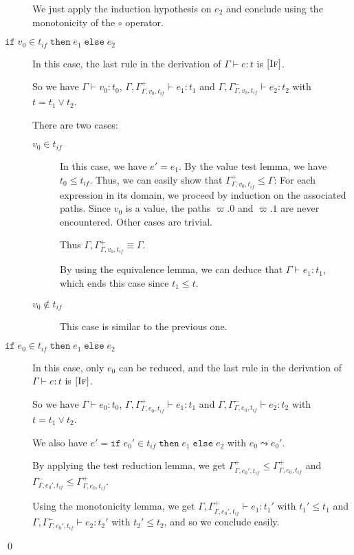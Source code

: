 \documentclass[a4paper]{article}%
\newcommand{\ite}[4]{\ensuremath{\texttt{if}\;#1\in#2\;\texttt{then}\;#3\;\texttt{else}\;#4}}
\theoremstyle{definition}
\newcommand {\Rule}[1] {[\textsc{#1}]}
\begin{document}
\begin{description}
          We just apply the induction hypothesis on $e_2$ and conclude using the monotonicity of the $\circ$ operator.
          \item[$\ite {v_0} {t_{if}} {e_1} {e_2}$] In this case, the last rule in the derivation of $\Gamma \vdash e:t$ is $\Rule{If}$.
           
          So we have $\Gamma \vdash v_0 : t_0$, $\Gamma, \Gamma^+_{\Gamma,v_0,t_{if}}\vdash e_1 : t_1$ and $\Gamma, \Gamma^-_{\Gamma,v_0,t_{if}}\vdash e_2 : t_2$ with $t=t_1\vee t_2$.
    
          There are two cases:
          \begin{description}
            \item[$v_0 \in t_{if}$] In this case, we have $e'=e_1$.
            By the value test lemma, we have $t_0 \leq t_{if}$.
            Thus, we can easily show that $\Gamma^+_{\Gamma,v_0,t_{if}} \leq \Gamma$:
            For each expression in its domain, we proceed by induction on the associated paths.
            Since $v_0$ is a value, the paths $\varpi.0$ and $\varpi.1$ are never encountered. Other cases are trivial.
    
            Thus $\Gamma, \Gamma^+_{\Gamma,v_0,t_{if}} \equiv \Gamma$.
    
            By using the equivalence lemma, we can deduce that $\Gamma \vdash e_1 : t_1$, which ends this case since $t_1 \leq t$.
            \item[$v_0 \not\in t_{if}$] This case is similar to the previous one.
          \end{description}
            
          \item[$\ite {e_0} {t_{if}} {e_1} {e_2}$] In this case, only $e_0$ can be reduced, and the last rule in the derivation of $\Gamma \vdash e:t$ is $\Rule{If}$.
          
          So we have $\Gamma \vdash e_0 : t_0$, $\Gamma, \Gamma^+_{\Gamma,e_0,t_{if}}\vdash e_1 : t_1$ and $\Gamma, \Gamma^-_{\Gamma,e_0,t_{if}}\vdash e_2 : t_2$ with $t=t_1\vee t_2$.
          
          We also have $e'=\ite {e_0'} {t_{if}} {e_1} {e_2}$ with $e_0\leadsto e_0'$.
    
          By applying the test reduction lemma, we get $\Gamma^+_{\Gamma,e_0',t_{if}} \leq \Gamma^+_{\Gamma,e_0,t_{if}}$ and
          $\Gamma^-_{\Gamma,e_0',t_{if}} \leq \Gamma^+_{\Gamma,e_0,t_{if}}$.
    
          Using the monotonicity lemma, we get $\Gamma, \Gamma^+_{\Gamma,e_0',t_{if}}\vdash e_1 : t_1'$ with $t_1'\leq t_1$
          and $\Gamma, \Gamma^-_{\Gamma,e_0',t_{if}}\vdash e_2 : t_2'$ with $t_2'\leq t_2$, and so we conclude easily.
        \end{description}
    
        \qed
\end{document}
